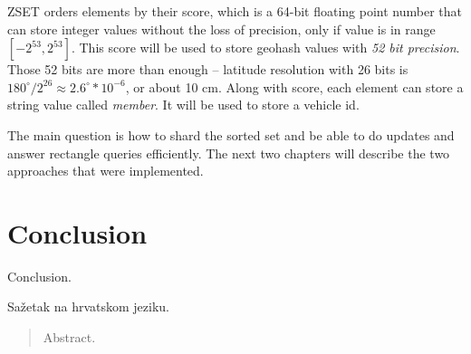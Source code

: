 \documentclass[times, utf8, diplomski]{fer}
\begin{document}
ZSET orders elements by their score, which is a 64-bit floating point number that can store integer values without the loss of precision, only if value is in range $[-2^{53}, 2^{53}]$. This score will be used to store geohash values with \emph{52 bit precision}. Those 52 bits are more than enough -- latitude resolution with 26 bits is $180^{\circ}/2^{26} \approx 2.6^{\circ}*10^{-6}$, or about 10 cm. Along with score, each element can store a string value called \emph{member}. It will be used to store a vehicle id.


The main question is how to shard the sorted set and be able to do updates and answer rectangle queries efficiently. The next two chapters will describe the two approaches that were implemented.
\chapter{Conclusion}
Conclusion.




















\begin{sazetak}
Sažetak na hrvatskom jeziku.

\end{sazetak}

\begin{abstract}
Abstract.

\end{abstract}
\end{document}
